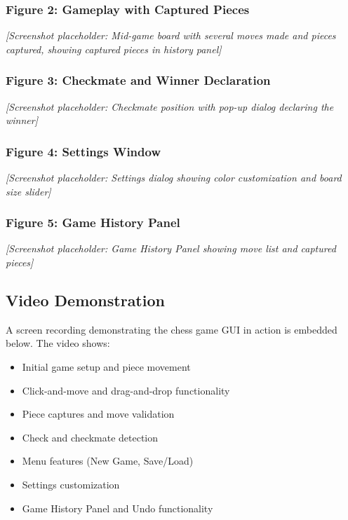 \documentclass[12pt]{article}
\begin{document}
\subsubsection{Figure 2: Gameplay with Captured Pieces}
\textit{[Screenshot placeholder: Mid-game board with several moves made and pieces captured, showing captured pieces in history panel]}

\subsubsection{Figure 3: Checkmate and Winner Declaration}
\textit{[Screenshot placeholder: Checkmate position with pop-up dialog declaring the winner]}

\subsubsection{Figure 4: Settings Window}
\textit{[Screenshot placeholder: Settings dialog showing color customization and board size slider]}

\subsubsection{Figure 5: Game History Panel}
\textit{[Screenshot placeholder: Game History Panel showing move list and captured pieces]}

\subsection{Video Demonstration}

A screen recording demonstrating the chess game GUI in action is embedded below. The video shows:
\begin{itemize}
    \item Initial game setup and piece movement
    \item Click-and-move and drag-and-drop functionality
    \item Piece captures and move validation
    \item Check and checkmate detection
    \item Menu features (New Game, Save/Load)
    \item Settings customization
    \item Game History Panel and Undo functionality
\end{itemize}

\end{document}
